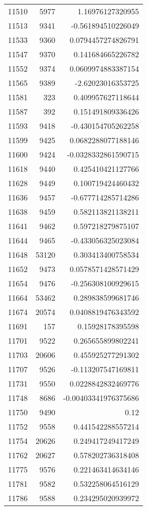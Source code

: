 \begin{tabular}{r | r | r}
11510 & 5977 & 1.16976127320955 \\
11513 & 9341 & -0.561894510226049 \\
11533 & 9360 & 0.0794457274826791 \\
11547 & 9370 & 0.141684665226782 \\
11552 & 9374 & 0.0609974883387154 \\
11565 & 9389 & -2.62023016353725 \\
11581 & 323 & 0.409957627118644 \\
11587 & 392 & 0.151491809336426 \\
11593 & 9418 & -0.430154705262258 \\
11599 & 9425 & 0.0682288077188146 \\
11600 & 9424 & -0.0328332861590715 \\
11618 & 9440 & 0.425410421127766 \\
11628 & 9449 & 0.100719424460432 \\
11636 & 9457 & -0.677714285714286 \\
11638 & 9459 & 0.582113821138211 \\
11641 & 9462 & 0.597218279875107 \\
11644 & 9465 & -0.433056325023084 \\
11648 & 53120 & 0.303413400758534 \\
11652 & 9473 & 0.0578571428571429 \\
11654 & 9476 & -0.256308100929615 \\
11664 & 53462 & 0.289838599681746 \\
11674 & 20574 & 0.0408819476343592 \\
11691 & 157 & 0.15928178395598 \\
11701 & 9522 & 0.265655899802241 \\
11703 & 20606 & 0.455925277291302 \\
11707 & 9526 & -0.113207547169811 \\
11731 & 9550 & 0.0228842832469776 \\
11748 & 8686 & -0.00403341976375686 \\
11750 & 9490 & 0.12 \\
11752 & 9558 & 0.441542288557214 \\
11754 & 20626 & 0.249417249417249 \\
11762 & 20627 & 0.578202736318408 \\
11775 & 9576 & 0.221463414634146 \\
11781 & 9582 & 0.532258064516129 \\
11786 & 9588 & 0.234295020939972 \\

\end{tabular}
